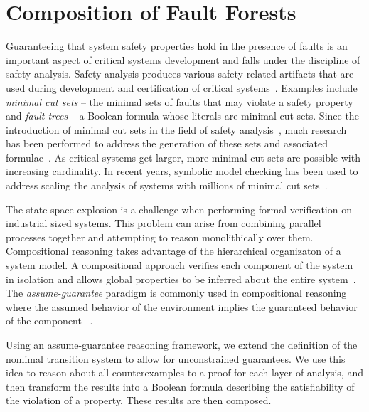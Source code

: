 \chapter{Composition of Fault Forests}
\label{chap:compFF}
Guaranteeing that system safety properties hold in the presence of faults is an important aspect of critical systems development and falls under the discipline of safety analysis. Safety analysis produces various safety related artifacts that are used during development and certification of critical systems~\cite{SAE:ARP4761,SAE:ARP4754A}. Examples include {\em minimal cut sets} -- the minimal sets of faults that may violate a safety property and {\em fault trees} -- a Boolean formula whose literals are minimal cut sets. Since the introduction of minimal cut sets in the field of safety analysis~\cite{vesely1981fault}, much research has been performed to address the generation of these sets and associated formulae~\cite{fta:survey,rauzy1993new,historyFTA}. As critical systems get larger, more minimal cut sets are possible with increasing cardinality. In recent years, symbolic model checking has been used to address scaling the analysis of systems with millions of minimal cut sets~\cite{bieber2002combination,schafer2003combining,fta:survey,symbFTA}. 

The state space explosion is a challenge when performing formal verification on industrial sized systems. This problem can arise from combining parallel processes together and attempting to reason monolithically over them. Compositional reasoning takes advantage of the hierarchical organizaton of a system model. A compositional approach verifies each component of the system in isolation and allows global properties to be inferred about the entire system~\cite{berezin1997compositional}. The {\em assume-guarantee} paradigm is commonly used in compositional reasoning where the assumed behavior of the environment implies the guaranteed behavior of the component ~\cite{NFM2012:CoGaMiWhLaLu}.

Using an assume-guarantee reasoning framework, we extend the definition of the nomimal transition system to allow for unconstrained guarantees. We use this idea to reason about all counterexamples to a proof for each layer of analysis, and then transform the results into a Boolean formula describing the satisfiability of the violation of a property. These results are then composed. 

